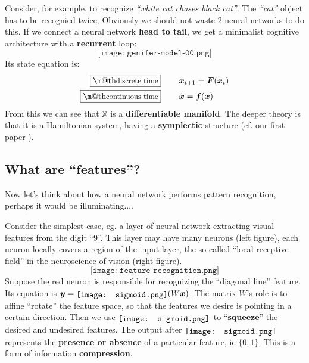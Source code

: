 \documentclass[orivec]{llncs}
\makeatletter
\newcommand{\vect}[1]{\boldsymbol{#1}}
\newcommand*\sigmoid{\raisebox{-.2\height}{\texttt{[image: sigmoid.png]}}}
\renewcommand{\boxed}[1]{\fbox{\m@th$\displaystyle\scalebox{0.9}{#1}$} \,}
\makeatother
\begin{document}
Consider, for example, to recognize \textit{``white cat chases black cat''}.  The \textit{``cat''} object has to be recognied twice;  Obviously we should not waste 2 neural networks to do this.  If we connect a neural network \textbf{head to tail}, we get a minimalist cognitive architecture with a \textbf{recurrent} loop:
\begin{equation}
\texttt{[image: genifer-model-00.png]}
\end{equation}
Its state equation is:
\begin{eqnarray}
\boxed{\mbox{discrete time}} \quad \quad & \vect{x}_{t+1} = \vect{F}(\vect{x}_t) \label{eqn0}\\
\boxed{\mbox{continuous time}} \quad \quad & \dot{\vect{x}} = \vect{f}(\vect{x}) \label{eqn:continuous-time}
\end{eqnarray}
From this we can see that $\mathbb{X}$ is a \textbf{differentiable manifold}.  The deeper theory is that it is a Hamiltonian system, having a \textbf{symplectic} structure (cf. our first paper \cite{YanLabyrinth}).

\subsection{What are ``features''?}

Now let's think about how a neural network performs pattern recognition, perhaps it would be illuminating....

Consider the simplest case, eg. a layer of neural network extracting visual features from the digit ``9''.  This layer may have many neurons (left figure), each neuron locally covers a region of the input layer, the so-called ``local receptive field'' in the neuroscience of vision (right figure).
\begin{equation}
\texttt{[image: feature-recognition.png]}
\end{equation}
Suppose the red neuron is responsible for recognizing the ``diagonal line'' feature.  Its equation is $\vect{y} = \sigmoid (W \vect{x})$.  The matrix $W$'s role is to affine ``rotate'' the feature space, so that the features we desire is pointing in a certain direction.  Then we use $\sigmoid$ to ``\textbf{squeeze}'' the desired and undesired features.  The output after $\sigmoid$ represents the \textbf{presence or absence} of a particular feature, ie $\{0, 1\}$.  This is a form of information \textbf{compression}.
\end{document}
